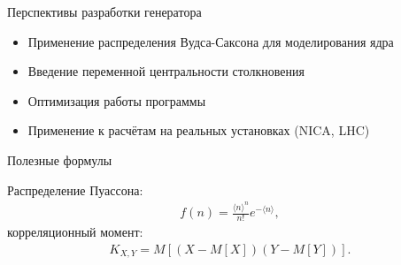 \documentclass[aspectratio=43]{beamer}
\begin{document}
\begin{frame}{Перспективы разработки генератора}

	\begin{itemize}[<+- | alert@+>]
		\item Применение распределения Вудса-Саксона для моделирования ядра
		\item Введение переменной центральности столкновения
		\item Оптимизация работы программы
		\item Применение к расчётам на реальных установках (NICA, LHC)
	\end{itemize}

\end{frame}

\begin{frame}{}	
\end{frame}

\begin{frame}{}	
\end{frame}



\begin{frame}{Полезные формулы}

	Распределение Пуассона:
	\begin{align*}
		f(n) = \frac{\langle n \rangle ^n}{n!}e^{-\langle n \rangle},
	\end{align*}
	корреляционный момент:
	\begin{align*}
		K_{X, Y} = M[(X - M[X])(Y - M[Y])].
	\end{align*}

\end{frame}
\end{document}
